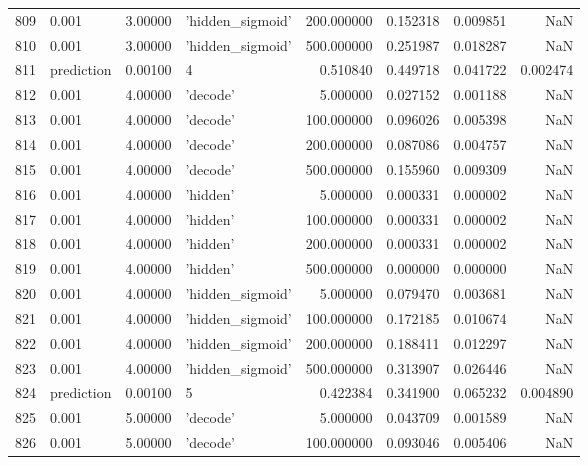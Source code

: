 \documentclass[10pt,a4paper]{article}
\begin{document}
\begin{tabular}{llrlrrrr}
809  &       0.001 &   3.00000 &   'hidden\_sigmoid' &  200.000000 &  0.152318 &  0.009851 &       NaN \\
810  &       0.001 &   3.00000 &   'hidden\_sigmoid' &  500.000000 &  0.251987 &  0.018287 &       NaN \\
811  &  prediction &   0.00100 &                  4 &    0.510840 &  0.449718 &  0.041722 &  0.002474 \\
812  &       0.001 &   4.00000 &           'decode' &    5.000000 &  0.027152 &  0.001188 &       NaN \\
813  &       0.001 &   4.00000 &           'decode' &  100.000000 &  0.096026 &  0.005398 &       NaN \\
814  &       0.001 &   4.00000 &           'decode' &  200.000000 &  0.087086 &  0.004757 &       NaN \\
815  &       0.001 &   4.00000 &           'decode' &  500.000000 &  0.155960 &  0.009309 &       NaN \\
816  &       0.001 &   4.00000 &           'hidden' &    5.000000 &  0.000331 &  0.000002 &       NaN \\
817  &       0.001 &   4.00000 &           'hidden' &  100.000000 &  0.000331 &  0.000002 &       NaN \\
818  &       0.001 &   4.00000 &           'hidden' &  200.000000 &  0.000331 &  0.000002 &       NaN \\
819  &       0.001 &   4.00000 &           'hidden' &  500.000000 &  0.000000 &  0.000000 &       NaN \\
820  &       0.001 &   4.00000 &   'hidden\_sigmoid' &    5.000000 &  0.079470 &  0.003681 &       NaN \\
821  &       0.001 &   4.00000 &   'hidden\_sigmoid' &  100.000000 &  0.172185 &  0.010674 &       NaN \\
822  &       0.001 &   4.00000 &   'hidden\_sigmoid' &  200.000000 &  0.188411 &  0.012297 &       NaN \\
823  &       0.001 &   4.00000 &   'hidden\_sigmoid' &  500.000000 &  0.313907 &  0.026446 &       NaN \\
824  &  prediction &   0.00100 &                  5 &    0.422384 &  0.341900 &  0.065232 &  0.004890 \\
825  &       0.001 &   5.00000 &           'decode' &    5.000000 &  0.043709 &  0.001589 &       NaN \\
826  &       0.001 &   5.00000 &           'decode' &  100.000000 &  0.093046 &  0.005406 &       NaN \\

\end{tabular}
\end{document}

